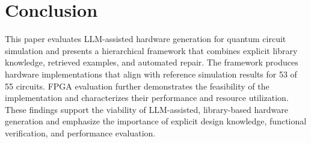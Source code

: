 \documentclass[conference]{IEEEtran}
\begin{document}

\section{Conclusion}
This paper evaluates LLM-assisted hardware generation for quantum circuit simulation and presents a hierarchical framework that combines explicit library knowledge, retrieved examples, and automated repair. The framework produces hardware implementations that align with reference simulation results for 53 of 55 circuits. FPGA evaluation further demonstrates the feasibility of the implementation and characterizes their performance and resource utilization. These findings support the viability of LLM-assisted, library-based hardware generation and emphasize the importance of explicit design knowledge, functional verification, and performance evaluation.
\end{document}
